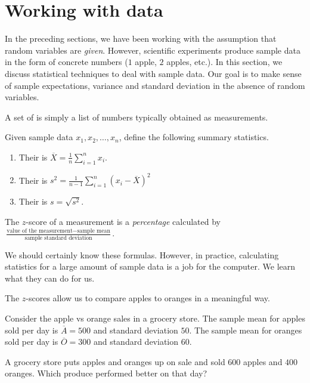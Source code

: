 \documentclass[../main.tex]{subfiles}
\begin{document}
 \section{Working with data}

In the preceding sections, we have been working with the assumption that random variables are \emph{given}.  However, scientific experiments produce sample data in the form of concrete numbers (\(1\) apple, \(2\) apples, etc.).  In this section, we discuss statistical techniques to deal with sample data.  Our goal is to make sense of sample expectations, variance and standard deviation in the absence of random variables. 

\begin{definition} \label{def:sample-statistics}
  A set of  is simply a list of numbers typically obtained as measurements.

  Given sample data \(x_{1}, x_{2}, \ldots, x_{n}\), define the following summary statistics.
  \begin{enumerate}
    \item Their  is \(\overline{X} = \frac{1}{n} \sum_{i=1}^{n} x_{i}\).

    \item Their  is \(s^{2} = \frac{1}{n-1} \sum_{i=1}^{n} \left( x_{i} - \overline{X} \right)^{2}\)

    \item Their  is \(s = \sqrt{s^{2}}\).
  \end{enumerate}

  \medskip
  The \(z\)-score of a measurement is a \emph{percentage} calculated by \(\frac{\text{value of the measurement} - \text{sample mean}}{\text{sample standard deviation}}\).  
\end{definition}

We should certainly know these formulas.  However, in practice, calculating statistics for a large amount of sample data is a job for the computer.  We learn what they can do for us.  

The \(z\)-scores allow us to compare apples to oranges in a meaningful way.
\begin{example} \label{ex:zscore-apples-oranges}
  Consider the apple vs orange sales in a grocery store. The sample mean for apples sold per day is \(\overline{A} = 500\) and standard deviation \(50\). The sample mean for oranges sold per day is \(\overline{O} = 300\) and standard deviation \(60\). 

  A grocery store puts apples and oranges up on sale and sold \(600\) apples and \(400\) oranges.  Which produce performed better on that day?

  \blanks*
\end{example}
\clearpage
\end{document}
